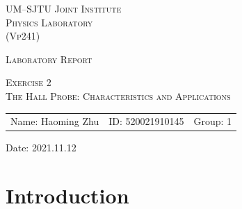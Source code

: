 \documentclass{article}
\begin{document}
\vspace*{0.4cm}

\hrulefill %

\thispagestyle{empty} %

\begin{center}
\begin{large}
\scshape{UM--SJTU Joint Institute \vspace{0.3em} \\ Physics Laboratory \\(Vp241)}
\end{large}

\hrulefill %

\vspace*{7.5cm}
\begin{Large}
\scshape{{Laboratory Report}}
\end{Large}

\vspace{2.5em}

\begin{large}
\scshape{Exercise 2}\\
\vspace{0.5em}
\scshape{The Hall Probe: Characteristics and Applications}
\end{large}
\end{center}

\vspace{13em}

\begin{table}[h!]
\center
\begin{tabular}{lll}
Name: Haoming  Zhu \hspace*{2em}&
ID: 520021910145\hspace*{2em}
& Group: 1 \\
\end{tabular}
\end{table}

\vspace{-0.4cm}

\begin{center}
\hspace{0.3em} Date: 2021.11.12
\end{center}

\newpage
\tableofcontents
\setcounter{page}{0}
\thispagestyle{empty}
\newpage



		\section{Introduction}
\end{document}
